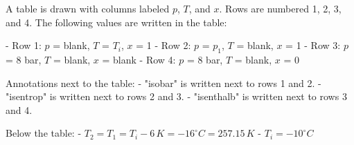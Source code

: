 A table is drawn with columns labeled \( p \), \( T \), and \( x \). Rows are numbered 1, 2, 3, and 4. The following values are written in the table:

- Row 1: \( p \) = blank, \( T \) = \( T_i \), \( x \) = 1
- Row 2: \( p \) = \( p_1 \), \( T \) = blank, \( x \) = 1
- Row 3: \( p \) = 8 bar, \( T \) = blank, \( x \) = blank
- Row 4: \( p \) = 8 bar, \( T \) = blank, \( x \) = 0

Annotations next to the table:
- "isobar" is written next to rows 1 and 2.
- "isentrop" is written next to rows 2 and 3.
- "isenthalb" is written next to rows 3 and 4.

Below the table:
- \( T_2 = T_1 = T_i - 6 \, K = -16^\circ C = 257.15 \, K \)
- \( T_i = -10^\circ C \)